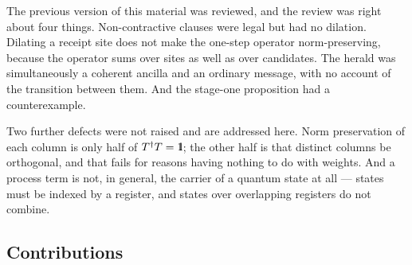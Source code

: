 \documentclass[11pt,a4paper]{article}
\newcommand{\Id}{\mathrm{1}\hspace{-0.30em}\mathrm{l}}
\theoremstyle{plain}
\theoremstyle{definition}
\theoremstyle{remark}
\begin{document}
The previous version of this material \cite{GWv4} was reviewed, and the review
was right about four things. Non-contractive clauses were legal but had no
dilation. Dilating a receipt site does not make the one-step operator
norm-preserving, because the operator sums over sites as well as over
candidates. The herald was simultaneously a coherent ancilla and an ordinary
message, with no account of the transition between them. And the stage-one
proposition had a counterexample.

Two further defects were not raised and are addressed here. Norm preservation of
each column is only half of $T^{\dagger}T = \Id$; the other half is that
distinct columns be orthogonal, and that fails for reasons having nothing to do
with weights. And a process term is not, in general, the carrier of a quantum
state at all --- states must be indexed by a register, and states over
overlapping registers do not combine.

\subsection{Contributions}
\end{document}
